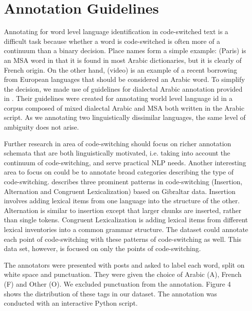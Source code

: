 \documentclass[10pt, a4paper]{article}
\begin{document}
\section{Annotation Guidelines}
Annotating for word level language identification in code-switched
text is a difficult task because whether a word is code-switched is
often more of a continuum than a binary decision. Place names form a
simple example:  (Paris) is an MSA word in that it is found
in most Arabic dictionaries, but it is clearly of French origin.  On
the other hand,  (video) is an example of a recent borrowing
from European languages that should be considered an Arabic word. To
simplify the decision, we made use of guidelines for dialectal Arabic
annotation provided in \cite{elfardy2012token}.  Their guidelines were
created for annotating world level language id in a corpus composed of
mixed dialectal Arabic and MSA both written in the Arabic script. As
we annotating two linguistically dissimilar languages, the same level
of ambiguity does not arise.

Further research in area of code-switching should focus on richer
annotation schemata that are both linguistically motivated,
i.e. taking into account the continuum of code-switching, and serve
practical NLP needs. Another interesting area to focus on could be to
annotate broad categories describing the type of
code-switching.  describes three prominent
patterns in code-switching (Insertion, Alternation and Congruent
Lexicalization) based on Gibraltar data. Insertion involves adding
lexical items from one language into the structure of the
other. Alternation is similar to insertion except that larger chunks
are inserted, rather than single tokens. Congruent Lexicalization is
adding lexical items from different lexical inventories into a common
grammar structure. The dataset could annotate each point of
code-switching with these patterns of code-switching as well.
 This data set, however, is focused on only the
points of code-switching.

The annotators were presented with posts and asked to label each word,
split on white space and punctuation.  They were given the choice of
Arabic (A), French (F) and Other (O). We excluded punctuation from the
annotation. Figure 4 shows the distribution of these tags in our
dataset. The annotation was conducted with an interactive Python
script.
\end{document}
